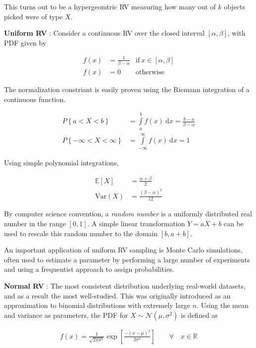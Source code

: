 This turns out to be a hypergeomtric RV measuring how many out of $ k $ objects picked were of type $ X $.


\textbf{Uniform RV} : Consider a continuous RV over the closed interval $ \left[\alpha, \beta\right] $, with PDF given by

\begin{align}
	f(x) &= \frac{1}{\beta - \alpha} & \text{if}\ x \in \left[\alpha, \beta\right] \\
	f(x) &= 0 & \text{otherwise} \nonumber
\end{align}

The normalization constriant is easily proven using the Riemann integration of a continuous function.

\begin{align}
	P \left\{a < X < b\right\} &= \int\limits_{a}^{b} f(x)\ \mathrm{d} x = \frac{b - a}{\beta - \alpha} \\
	P \left\{-\infty < X < \infty\right\} &= \int\limits_{-\infty}^{\infty} f(x)\ \mathrm{d} x = 1 \nonumber
\end{align}

Using simple polynomial integrations,

\begin{align}
	\mathbb{E}[X] &= \frac{\alpha + \beta}{2} \\
	\mathrm{Var}(X) &= \frac{(\beta - \alpha)^2}{12} 
\end{align}


By computer science convention, a \textit{random number} is a uniformly distributed real number in the range $ [0, 1] $. A simple linear transformation $ Y = aX + b $ can be used to rescale this random number to the domain $ [b, a+b] $.

An important application of uniform RV sampling is Monte Carlo simulations, often used to estimate a parameter by performing a large number of experiments and using a frequentist approach to assign probabilities.

\textbf{Normal RV} : The most consistent distribution underlying real-world datasets, and as a result the most well-studied. This was originally introduced as an approximation to binomial distributions with extremely large $ n $. Using the mean and variance as parameters, the PDF for $ X \sim \mathcal{N}(\mu, \sigma^2) $ is defined as

\begin{align}
	f(x) = \frac{1}{\sqrt{2 \pi \sigma^2}} \exp \left[\frac{- (x - \mu)^2}{2\sigma^2}\right] \qquad \forall \quad x \in \mathbb{R}
\end{align}

